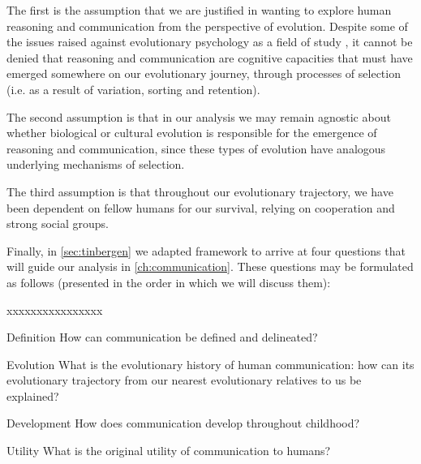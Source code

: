 The first is the assumption that we are justified in wanting to explore human reasoning and communication from the perspective of evolution. Despite some of the issues raised against evolutionary psychology as a field of study \citep{LB02}, it cannot be denied that reasoning and communication are cognitive capacities that must have emerged somewhere on our evolutionary journey, through processes of selection (i.e. as a result of variation, sorting and retention).

The second assumption is that in our analysis we may remain agnostic about whether biological or cultural evolution is responsible for the emergence of reasoning and communication, since these types of evolution have analogous underlying mechanisms of selection.


The third assumption is that throughout our evolutionary trajectory, we have been dependent on fellow humans for our survival, relying on cooperation and strong social groups.

Finally, in \cref{sec:tinbergen} we adapted  framework to arrive at four questions that will guide our analysis in \cref{ch:communication}. These questions may be formulated as follows (presented in the order in which we will discuss them):

\begin{labeling}{xxxxxxxxxxxxxxxx}
    \item [Definition] How can communication be defined and delineated?
    \item [Evolution] What is the evolutionary history of human communication: how can its evolutionary trajectory from our nearest evolutionary relatives to us be explained?
    \item [Development] How does communication develop throughout childhood?
    \item [Utility] What is the original utility of communication to humans?
\end{labeling}

